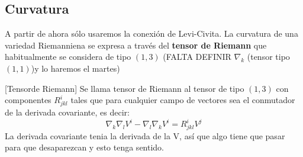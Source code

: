 \documentclass[palatino, bibnumbers]{apuntes}
\begin{document}
\subsection{Curvatura}
 A partir de ahora sólo usaremos la conexión de Levi-Civita. La curvatura de una variedad Riemanniena se expresa a través del \textbf{tensor de Riemann} que habitualmente se considera de tipo $(1,3)$
 (FALTA DEFINIR $\nabla_k$ (tensor tipo $(1,1)$)y lo haremos el martes)
 
 \begin{defn}\label{def:tensorRiemann}[Tensor\IS de Riemann] Se llama tensor de Riemann al tensor de tipo $(1,3)$ con componentes $R^i_{jkl}$ tales que para cualquier campo de vectores sea el conmutador de la derivada covariante, es decir: $$\nabla_k\nabla_lV^i-\nabla_l\nabla_kV^i=R^i_{jkl}V^j$$ La derivada covariante tenia la derivada de la V, así que algo tiene que pasar para que desaparezcan y esto tenga sentido.
 \end{defn}
\end{document}
